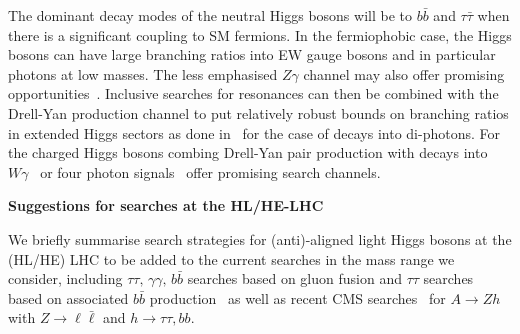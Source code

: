 \documentclass[../report.tex]{subfiles}
\begin{document}
The dominant decay modes of the neutral Higgs bosons will be to $b\bar{b}$ and $\tau\bar{\tau}$ when there is a significant coupling to SM fermions. In the fermiophobic case, the Higgs bosons can have large branching ratios into EW gauge bosons and in particular photons at low masses. The less emphasised $Z\gamma$ channel may also offer promising opportunities~\cite{Degrande:2017naf}. Inclusive searches for resonances can then be combined with the Drell-Yan production channel to put relatively robust bounds on branching ratios in extended Higgs sectors as done in~\cite{Delgado:2016arn,Vega:2018ddp} for the case of decays into di-photons. For the charged Higgs bosons combing Drell-Yan pair production with decays into $W\gamma$~\cite{Ilisie:2014hea,Degrande:2017naf} or four photon signals~\cite{Aaltonen:2016fnw} offer promising search channels.


{\bf{Suggestions for searches at the HL/HE-LHC}}

We briefly summarise search strategies for (anti)-aligned light
Higgs bosons at the (HL/HE) LHC to be added to the current searches in the mass range we consider, including
$\tau\tau,\,\gamma\gamma,\,b\bar{b}$ searches based on gluon fusion and
$\tau\tau$ searches based on associated $b\bar{b}$
production~\cite{Aad:2014vgg,Khachatryan:2014wca,Khachatryan:2015baw} as
well as recent CMS searches~\cite{CMS:2015mba} for $A \to Zh$ with $Z
\to \ell\bar\ell$ and $h\to \tau\tau, bb$.  

\end{document}
